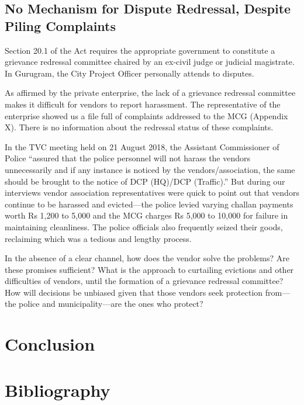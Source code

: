 \documentclass[a4paper, 12pt, twoside]{article}
\begin{document}
\subsection{No Mechanism for Dispute Redressal, Despite Piling Complaints}
Section 20.1 of the Act requires the appropriate government to constitute a grievance redressal committee chaired by an ex-civil judge or judicial magistrate. In Gurugram, the City Project Officer personally attends to disputes. 

As affirmed by the private enterprise, the lack of a grievance redressal committee makes it difficult for vendors to report harassment. The representative of the enterprise showed us a file full of complaints addressed to the MCG (Appendix X). There is no information about the redressal status of these complaints. 

In the TVC meeting held on 21 August 2018, the Assistant Commissioner of Police “assured that the police personnel will not harass the vendors unnecessarily and if any instance is noticed by the vendors/association, the same should be brought to the notice of DCP (HQ)/DCP (Traffic).” But during our interviews vendor association representatives were quick to point out that  vendors continue to be harassed and evicted—the police levied varying challan payments worth Rs 1,200 to 5,000 and the MCG charges Rs 5,000 to 10,000 for failure in maintaining cleanliness. The police officials also frequently seized their goods, reclaiming which was a tedious and lengthy process. 

In the absence of a clear channel, how does the vendor solve the problems? Are these promises sufficient? What is the approach to curtailing evictions and other difficulties of vendors, until the formation of a grievance redressal committee? How will decisions be unbiased given that those vendors seek protection from—the police and municipality—are the ones who protect? 

\section*{Conclusion}

\section*{Bibliography}
\printbibliography[heading=none] 
\end{document}
